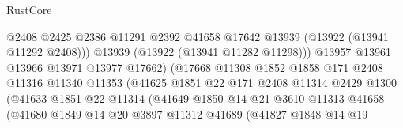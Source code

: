 \begin{lexlean}{RustCore}
\begin{coremodule}
                                        @2408
                                        @2425
                                        @2386
                                        @11291
                                        @2392
                                        @41658
                                        @17642
                                        @13939
                                        (@13922 (@13941 @11292 @2408)))
                                      @13939
                                      (@13922 (@13941 @11282 @11298)))
                                    @13957
                                    @13961
                                    @13966
                                    @13971
                                    @13977
                                    @17662)
                                  (@17668
                                    @11308
                                    @1852
                                    @1858
                                    @171
                                    @2408
                                    @11316
                                    @11340
                                    @11353
                                    (@41625
                                      @1851
                                      @22
                                      @171
                                      @2408
                                      @11314
                                      @2429
                                      @1300
                                      (@41633
                                        @1851
                                        @22
                                        @11314
                                        (@41649
                                          @1850
                                          @14
                                          @21
                                          @3610
                                          @11313
                                          @41658
                                          (@41680
                                            @1849
                                            @14
                                            @20
                                            @3897
                                            @11312
                                            @41689
                                            (@41827
                                              @1848
                                              @14
                                              @19

\end{coremodule}
\end{lexlean}
